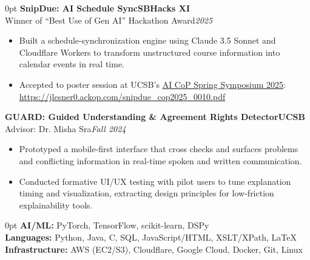 \documentclass[11pt]{article}
\newlength{\sectionwidth}
\newcommand{\CVSection}[2]{%
  \vspace{1.4em} 
  \noindent
  \makebox[0pt][l]{%
    \parbox[t]{\sectionwidth}{%
      \raggedright\scshape\bfseries\small #1%
    }%
  }%
  \begin{adjustwidth}{\sectionwidth}{0pt}
    #2
  \end{adjustwidth}
}
\newcommand{\CVEntry}[4]{%
  \vspace{0.4em} %
  {\bfseries #1}\hfill {\bfseries #2}\\[0.1em] 
  #3\hfill \textit{#4}
}
\begin{document}
\CVSection{Prototypes}{%
  \CVEntry
    {SnipDue: AI Schedule Sync}
    {SBHacks XI}
    {Winner of ``Best Use of Gen AI'' Hackathon Award}
    {2025}
  \begin{itemize}
    \item Built a schedule-synchronization engine using Claude 3.5 Sonnet and Cloudflare Workers to transform unstructured course information into calendar events in real time.
    \item Accepted to poster session at UCSB's \href{https://otl.ucsb.edu/ai-cop-spring-symposium-2025}{AI CoP Spring Symposium 2025}:\\ \href{https://jlesner0.ackop.com/snipdue_cop2025_0010.pdf}{https://jlesner0.ackop.com/snipdue\_cop2025\_0010.pdf}
  \end{itemize}
\vspace{0.4em}
  \CVEntry
    {GUARD: Guided Understanding \& Agreement Rights Detector}
    {UCSB}
    {Advisor: Dr. Misha Sra}
    {Fall 2024}
  \begin{itemize}
    \item Prototyped a mobile-first interface that cross checks and surfaces problems and conflicting information in real-time spoken and written communication.
    \item Conducted formative UI/UX testing with pilot users to tune explanation timing and visualization, extracting design principles for low-friction explainability tools.
  \end{itemize}
}



\CVSection{Skills}{%
  \textbf{AI/ML:} PyTorch, TensorFlow, scikit-learn, DSPy \\
  \textbf{Languages:} Python, Java, C, SQL, JavaScript/HTML, XSLT/XPath, LaTeX\\
  \textbf{Infrastructure:} AWS (EC2/S3), Cloudflare, Google Cloud, Docker, Git, Linux
}
\end{document}

